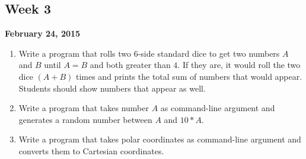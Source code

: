 \documentclass[12pt,letterpaper,twoside]{article}
\begin{document}


\subsection*{Week 3}
\hfill \textbf{February 24, 2015}

\begin{enumerate}\itemsep=0pt
\item Write a program that rolls two 6-side standard dice to get two numbers $A$ and $B$ until $A = B$ and both greater than $4$. If they are, it would roll the two dice $(A + B)$ times and prints the total sum of numbers that would appear. Students should show numbers that appear as well.
\item Write a program that takes number $A$ as command-line argument and generates a random number between $A$ and $10*A$.
\item Write a program that takes polar coordinates as command-line argument and converts them to Cartesian coordinates.
\end{enumerate}
\end{document}
